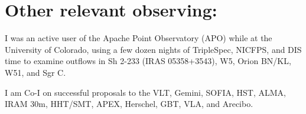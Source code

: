 
\section*{Other relevant observing:}
I was an active user of the Apache Point Observatory (APO) while at the
University of Colorado, using a few dozen nights of TripleSpec, NICFPS, and DIS
time to examine outflows in Sh 2-233 (IRAS 05358+3543), W5, Orion BN/KL, W51,
and Sgr C.

I am Co-I on successful proposals to the VLT, Gemini, SOFIA, HST, ALMA, IRAM
30m, HHT/SMT, APEX, Herschel, GBT, VLA, and Arecibo.  

